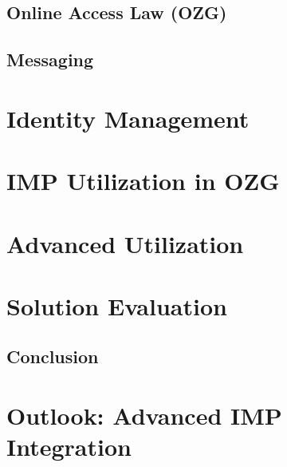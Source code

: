 \documentclass[
     12pt,         %
     a4paper,      %
     BCOR=10mm,version=first,     %
     DIV=14,version=first,        %
     ]{scrreprt}
\begin{document}
\section{Online Access Law (OZG)}



\section{Messaging}



\chapter{Identity Management}



\chapter{IMP Utilization in OZG}



\chapter{Advanced Utilization}



\chapter{Solution Evaluation}

\section{Conclusion}

\chapter{Outlook: Advanced IMP Integration}

\printbibliography
\end{document}
